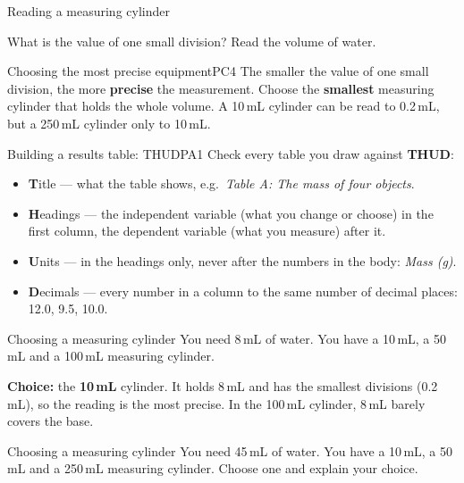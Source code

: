 \begin{wedo}{Reading a measuring cylinder}
\begin{minipage}[c]{0.64\linewidth}
What is the value of one small division?
\workbox{2.2cm}
Read the volume of water.
\answerbox{1cm}
\end{minipage}\hfill
\begin{minipage}[c]{0.3\linewidth}\centering
{}
\end{minipage}
\end{wedo}

\begin{technique}{Choosing the most precise equipment}{PC4}
The smaller the value of one small division, the more \textbf{precise} the measurement. Choose the \textbf{smallest} measuring cylinder that holds the whole volume. A 10\,mL cylinder can be read to 0.2\,mL, but a 250\,mL cylinder only to 10\,mL.
\end{technique}

\begin{technique}{Building a results table: THUD}{PA1}
Check every table you draw against \textbf{THUD}:
\begin{itemize}[leftmargin=1.4em, itemsep=1pt, topsep=3pt]
  \item \textbf{T}itle --- what the table shows, e.g.\ \emph{Table A: The mass of four objects}.
  \item \textbf{H}eadings --- the independent variable (what you change or choose) in the first column, the dependent variable (what you measure) after it.
  \item \textbf{U}nits --- in the headings only, never after the numbers in the body: \emph{Mass (g)}.
  \item \textbf{D}ecimals --- every number in a column to the same number of decimal places: 12.0, 9.5, 10.0.
\end{itemize}
\end{technique}

\begin{workedex}{Choosing a measuring cylinder}
You need 8\,mL of water. You have a 10\,mL, a 50\,mL and a 100\,mL measuring cylinder.

\smallskip
\textbf{Choice:} the \textbf{10\,mL} cylinder. It holds 8\,mL and has the smallest divisions (0.2\,mL), so the reading is the most precise. In the 100\,mL cylinder, 8\,mL barely covers the base.
\end{workedex}

\begin{wedo}{Choosing a measuring cylinder}
You need 45\,mL of water. You have a 10\,mL, a 50\,mL and a 250\,mL measuring cylinder. Choose one and explain your choice.
\answerbox{5cm}
\end{wedo}

